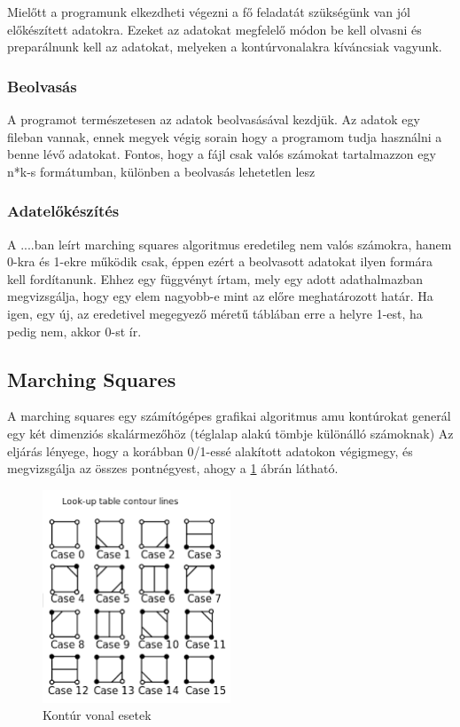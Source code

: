 \documentclass[a4paper, 12pt]{article}
\numberwithin{equation}{section}          %
\numberwithin{figure}{subsection}
\begin{document}
Mielőtt a programunk elkezdheti végezni a fő feladatát szükségünk van jól előkészített adatokra. Ezeket az adatokat megfelelő módon be kell olvasni és preparálnunk kell az adatokat, melyeken a kontúrvonalakra kíváncsiak vagyunk.

\subsubsection{Beolvasás}
\label{subsubsec:alalfejezet}

A programot természetesen az adatok beolvasásával kezdjük. Az adatok egy fileban vannak, ennek megyek végig sorain hogy a programom tudja használni a benne lévő adatokat. Fontos, hogy a fájl csak valós számokat tartalmazzon egy n*k-s formátumban, különben a beolvasás lehetetlen lesz

\subsubsection{Adatelőkészítés}
\label{subsubsec:alalfejezet2}

A ....ban leírt marching squares algoritmus eredetileg nem valós számokra, hanem 0-kra és 1-ekre működik csak, éppen ezért a beolvasott adatokat ilyen formára kell fordítanunk. Ehhez egy függvényt írtam, mely egy adott adathalmazban megvizsgálja, hogy egy elem nagyobb-e mint az előre meghatározott határ. Ha igen, egy új, az eredetivel megegyező méretű táblában erre a helyre 1-est, ha pedig nem, akkor 0-st ír.  


\subsection{Marching Squares}

A marching squares egy számítógépes grafikai algoritmus amu kontúrokat generál egy két dimenziós skalármezőhöz (téglalap alakú tömbje különálló számoknak) \cite{wiki1} Az eljárás lényege, hogy a korábban 0/1-essé alakított adatokon végigmegy, és megvizsgálja az összes pontnégyest, ahogy a \ref{fig:lookup} ábrán látható.

\begin{figure}[h!]
\begin{center}
\includegraphics[width=0.5\textwidth]{img/download.png}
\caption{Kontúr vonal esetek}
\label{fig:lookup}
\end{center}
\end{figure}
\end{document}
